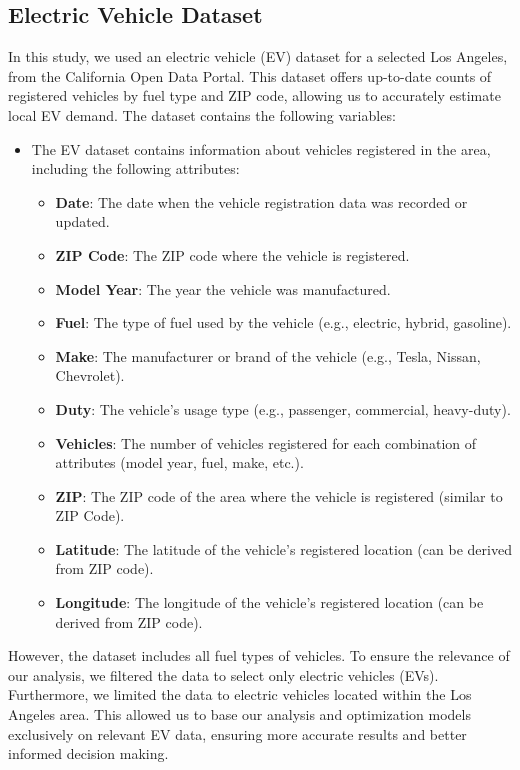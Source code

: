 \subsection{Electric Vehicle Dataset}
In this study, we used an electric vehicle (EV) dataset for a selected  Los Angeles, from the California Open Data Portal\cite{EV_dataset}. This dataset offers up-to-date counts of registered vehicles by fuel type and ZIP code, allowing us to accurately estimate local EV demand. The dataset contains the following variables:

\begin{itemize}
    \item The EV dataset contains information about vehicles registered in the area, including the following attributes:
    \begin{itemize}
        \item \textbf{Date}: The date when the vehicle registration data was recorded or updated.
        \item \textbf{ZIP Code}: The ZIP code where the vehicle is registered.
        \item \textbf{Model Year}: The year the vehicle was manufactured.
        \item \textbf{Fuel}: The type of fuel used by the vehicle (e.g., electric, hybrid, gasoline).
        \item \textbf{Make}: The manufacturer or brand of the vehicle (e.g., Tesla, Nissan, Chevrolet).
        \item \textbf{Duty}: The vehicle's usage type (e.g., passenger, commercial, heavy-duty).
        \item \textbf{Vehicles}: The number of vehicles registered for each combination of attributes (model year, fuel, make, etc.).
        \item \textbf{ZIP}: The ZIP code of the area where the vehicle is registered (similar to ZIP Code).
        \item \textbf{Latitude}: The latitude of the vehicle’s registered location (can be derived from ZIP code).
        \item \textbf{Longitude}: The longitude of the vehicle’s registered location (can be derived from ZIP code).
    \end{itemize}
\end{itemize}


However, the dataset includes all fuel types of vehicles. To ensure the relevance of our analysis, we filtered the data to select only electric vehicles (EVs). Furthermore, we limited the data to electric vehicles located within the Los Angeles area. This allowed us to base our analysis and optimization models exclusively on relevant EV data, ensuring more accurate results and better informed decision making.

